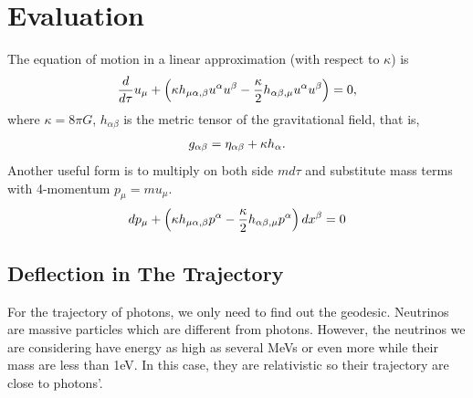 \documentclass[letterpaper,12pt,english]{sphinxmanual}
\begin{document}
\section{Evaluation}
\label{gravity:evaluation}
The equation of motion in a linear approximation (with respect to  \(\kappa\)) is
\begin{gather}
\begin{split}\frac{d}{d\tau}u_\mu + \left( \kappa h_{\mu\alpha,\beta} u^\alpha u^\beta - \frac{\kappa}{2}h_{\alpha\beta,\mu}u^\alpha u^\beta \right) = 0,\end{split}\notag
\end{gather}
where \(\kappa=8\pi G\), \(h_{\alpha\beta}\) is the metric tensor of the gravitational field, that is,
\begin{gather}
\begin{split}g_{\alpha\beta} = \eta_{\alpha\beta} + \kappa h_{\alpha}.\end{split}\notag
\end{gather}
Another useful form is to multiply on both side \(m d\tau\) and substitute mass terms with 4-momentum \(p_\mu = m u_\mu\).
\begin{gather}
\begin{split}d p_\mu + \left( \kappa h_{\mu\alpha,\beta} p^\alpha - \frac{\kappa}{2} h_{\alpha\beta,\mu} p^\alpha \right) dx^{\beta} = 0\end{split}\notag
\end{gather}

\subsection{Deflection in The Trajectory}
\label{gravity:deflection-in-the-trajectory}
For the trajectory of photons, we only need to find out the geodesic. Neutrinos are massive particles which are different from photons. However, the neutrinos we are considering have energy as high as several MeVs or even more while their mass are less than 1eV. In this case, they are relativistic so their trajectory are close to photons'.
\end{document}
